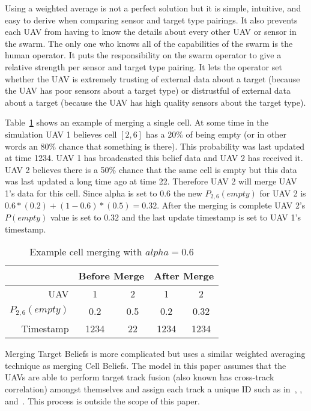 \begin{multicols*}{2}
Using a weighted average is not a perfect solution but it is simple, intuitive, and easy to derive when comparing sensor and target type pairings.  It also prevents each UAV from having to know the details about every other UAV or sensor in the swarm.  The only one who knows all of the capabilities of the swarm is the human operator. It puts the responsibility on the swarm operator to give a relative strength per sensor and target type pairing.  It lets the operator set whether the UAV is extremely trusting of external data about a target (because the UAV has poor sensors about a target type) or distrustful of external data about a target (because the UAV has high quality sensors about the target type).

Table~\ref{tab:exampleCellMerge} shows an example of merging a single cell.  At some time in the simulation UAV 1 believes cell $[2, 6]$ has a 20\% of being empty (or in other words an 80\% chance that something is there). This probability was last updated at time 1234.  UAV 1 has broadcasted this belief data and UAV 2 has received it.  UAV 2 believes there is a 50\% chance that the same cell is empty but this data was last updated a long time ago at time 22.  Therefore UAV 2 will merge UAV 1's data for this cell.  Since alpha is set to 0.6 the new $P_{2,6}(empty)$ for UAV 2 is $0.6*(0.2) + (1-0.6)*(0.5)=0.32$.  After the merging is complete UAV 2's $P(empty)$ value is set to $0.32$ and the last update timestamp is set to UAV 1's timestamp.

\begin{table}[H]
	\caption{Example cell merging with $alpha=0.6$}
	\centering
	\label{tab:exampleCellMerge}
	\begin{tabular}{|r|c|c||c|c|}
		\hline
		& \multicolumn{2}{c||}{Before Merge} & \multicolumn{2}{c|}{After Merge} \\
		\hline
		UAV             & 1   & 2                            & 1   & 2 \\
		\hline
		$P_{2,6}(empty)$& 0.2 & 0.5                          & 0.2 & 0.32 \\
		\hline
		Timestamp       & 1234& 22                           & 1234& 1234 \\
		\hline
	\end{tabular}
\end{table}

Merging Target Beliefs is more complicated but uses a similar weighted averaging technique as merging Cell Beliefs.  The model in this paper assumes that the UAVs are able to perform target track fusion (also known has cross-track correlation) amongst themselves and assign each track a unique ID such as in~\cite{stroupe}, \cite{barooah}, and~\cite{spillings}.  This process is outside the scope of this paper.


\end{multicols*}
